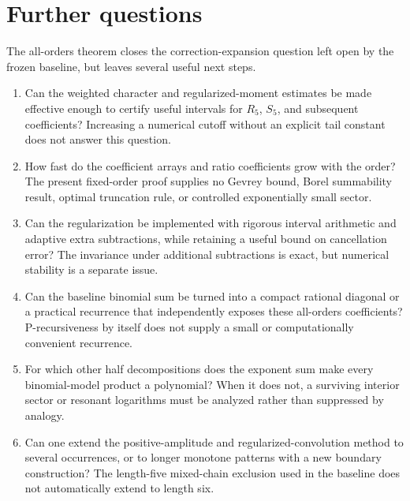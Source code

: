 \documentclass[11pt,letterpaper]{article}
\theoremstyle{remark}\newtheorem{remark}[theorem]{Remark}
\numberwithin{equation}{section}
\begin{document}
\section{Further questions}\label{upo:all5:sec:questions}
The all-orders theorem closes the correction-expansion question left
open by the frozen baseline, but leaves several useful next steps.
\begin{enumerate}
\item Can the weighted character and regularized-moment estimates
be made effective enough to certify useful intervals for $R_5$,
$S_5$, and subsequent coefficients? Increasing a numerical cutoff
without an explicit tail constant does not answer this question.
\item How fast do the coefficient arrays and ratio coefficients
grow with the order? The present fixed-order proof supplies no
Gevrey bound, Borel summability result, optimal truncation rule, or
controlled exponentially small sector.
\item Can the regularization be implemented with rigorous interval
arithmetic and adaptive extra subtractions, while retaining a useful
bound on cancellation error? The invariance under additional
subtractions is exact, but numerical stability is a separate issue.
\item Can the baseline binomial sum be turned into a compact rational
diagonal or a practical recurrence that independently exposes these
all-orders coefficients? P-recursiveness by itself does not supply a
small or computationally convenient recurrence.
\item For which other half decompositions does the exponent sum
make every binomial-model product a polynomial? When it does not,
a surviving interior sector or resonant logarithms must be analyzed
rather than suppressed by analogy.
\item Can one extend the positive-amplitude and regularized-convolution
method to several occurrences, or to longer monotone patterns with
a new boundary construction? The length-five mixed-chain exclusion
used in the baseline does not automatically extend to length six.
\end{enumerate}
\end{document}
